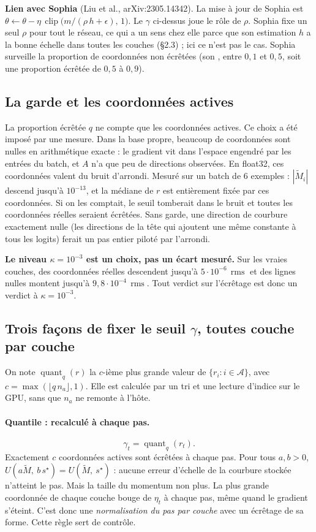 \documentclass[11pt,a4paper]{article}
\newcommand{\fic}[1]{\texttt{\detokenize{#1}}}
\newcommand{\Mt}{\widetilde{M}}
\DeclareMathOperator{\rms}{rms}
\begin{document}
\textbf{Lien avec Sophia} (Liu et al., arXiv:2305.14342). La mise à jour de Sophia est
$\theta \leftarrow \theta - \eta\,\operatorname{clip}\bigl(m/(\rho\,h + \epsilon),\,1\bigr)$.
Le $\gamma$ ci-dessus joue le rôle de $\rho$. Sophia fixe un seul $\rho$ pour tout le réseau, ce qui a
un sens chez elle parce que son estimation $h$ a la bonne échelle dans toutes les couches (§2.3) ;
ici ce n'est pas le cas. Sophia surveille la proportion de coordonnées non écrêtées (son
\fic{win_rate}, entre $0{,}1$ et $0{,}5$, soit une proportion écrêtée de $0{,}5$ à $0{,}9$).

\subsection{La garde et les coordonnées actives}

La proportion écrêtée $q$ ne compte que les coordonnées actives. Ce choix a été imposé par une mesure.
Dans la base propre, beaucoup de coordonnées sont nulles en arithmétique exacte : le gradient vit dans
l'espace engendré par les entrées du batch, et $A$ n'a que peu de directions observées. En float32,
ces coordonnées valent du bruit d'arrondi. Mesuré sur un batch de 6 exemples : $|\Mt_i|$ descend
jusqu'à $10^{-13}$, et la médiane de $r$ est entièrement fixée par ces coordonnées. Si on les
comptait, le seuil tomberait dans le bruit et toutes les coordonnées réelles seraient écrêtées. Sans
garde, une direction de courbure exactement nulle (les directions de la tête qui ajoutent une même
constante à tous les logits) ferait un pas entier piloté par l'arrondi.

\textbf{Le niveau $\kappa = 10^{-3}$ est un choix, pas un écart mesuré.} Sur les vraies couches, des
coordonnées réelles descendent jusqu'à $5\cdot10^{-6}\,\rms$ et des lignes nulles montent jusqu'à
$9{,}8\cdot10^{-4}\,\rms$. Tout verdict sur l'écrêtage est donc un verdict à $\kappa = 10^{-3}$.

\subsection{Trois façons de fixer le seuil $\gamma$, toutes couche par couche}

On note $\operatorname{quant}_q(r)$ la $c$-ième plus grande valeur de $\{r_i : i \in \mathcal A\}$,
avec $c = \max(\lfloor q\, n_a \rfloor, 1)$. Elle est calculée par un tri et une lecture d'indice sur
le GPU, sans que $n_a$ ne remonte à l'hôte.

\paragraph{Quantile : recalculé à chaque pas.}
\[
  \gamma_t = \operatorname{quant}_q(r_t) .
\]
Exactement $c$ coordonnées actives sont écrêtées à chaque pas. Pour tous $a, b > 0$,
$U(a\Mt,\ b\,s^\star) = U(\Mt,\ s^\star)$ : aucune erreur d'échelle de la courbure stockée n'atteint
le pas. Mais la taille du momentum non plus. La plus grande coordonnée de chaque couche bouge de
$\eta_t$ à chaque pas, même quand le gradient s'éteint. C'est donc une \emph{normalisation du pas par
couche} avec un écrêtage de sa forme. Cette règle sert de contrôle.
\end{document}
